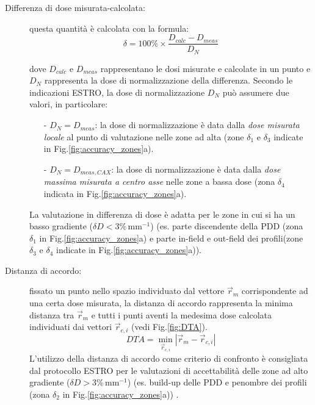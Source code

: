 \begin{description}

\item[Differenza di dose misurata-calcolata:] questa quantità è calcolata con la formula:
\begin{equation}
\delta = 100\% \times \frac{D_{calc} - D_{meas}}{D_{N}}
\end{equation}

dove $D_{calc}$ e $D_{meas}$ rappresentano le dosi misurate e calcolate in un punto e $D_N$ rappresenta la dose di normalizzazione della differenza. Secondo le indicazioni ESTRO, la dose di normalizzazione $D_N$ può assumere due valori, in particolare:
\begin{itemize}
\item[-] $D_N=D_{meas}$: la dose di normalizzazione è data dalla \textit{dose misurata locale} al punto di valutazione nelle zone ad alta (zone $\delta_1$ e $\delta_3$ indicate in Fig.\ref{fig:accuracy_zones}a).
\item[-] $D_N=D_{meas,CAX}$: la dose di normalizzazione è data dalla \textit{dose massima misurata a centro asse} nelle zone a bassa dose (zona $\delta_4$ indicata in Fig.\ref{fig:accuracy_zones}a).
\end{itemize}

La valutazione in differenza di dose è adatta per le zone in cui si ha un basso gradiente ($\delta D < 3\%\,$mm$^{-1}$) (es. parte discendente della PDD (zona $\delta_1$ in Fig.\ref{fig:accuracy_zones}a) e parte in-field e out-field dei profili(zone $\delta_3$ e $\delta_4$ indicate in Fig.\ref{fig:accuracy_zones}a)).

\item[Distanza di accordo:] fissato un punto nello spazio individuato dal vettore $\vec{r}_{m}$ corrispondente ad una certa dose misurata, la distanza di accordo rappresenta la minima distanza tra $\vec{r}_{m}$ e tutti i punti aventi la medesima dose calcolata individuati dai vettori $\vec{r}_{c,i}$ (vedi Fig.\ref{fig:DTA}).
\begin{equation}
DTA = \min_{\vec{r}_{c,i}} \left|\vec{r}_{m} - \vec{r}_{c,i}\right|
\end{equation}
L'utilizzo della distanza di accordo come criterio di confronto è consigliata dal protocollo ESTRO per le valutazioni di accettabilità delle zone ad alto gradiente ($\delta D > 3\%\,$mm$^{-1}$) (es. build-up delle PDD e penombre dei profili (zona $\delta_2$ in Fig.\ref{fig:accuracy_zones}a)) .
\end{description}

